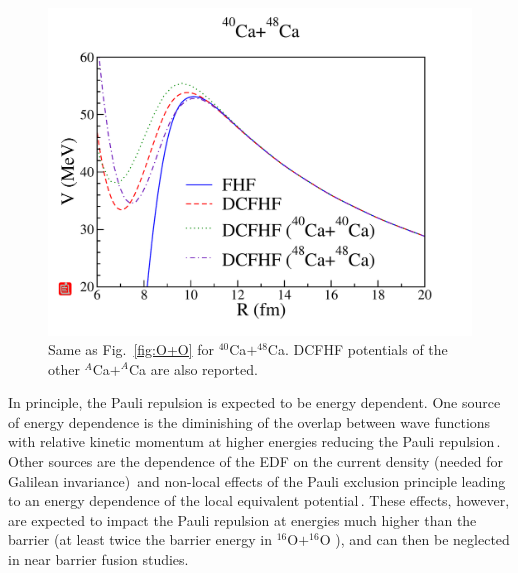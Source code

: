 \begin{figure}
	\includegraphics[width=\textwidth]{../Figures/Pauli/pot_40Ca+48Ca.pdf}
	\caption{Same as Fig.~\ref{fig:O+O} for $^{40}$Ca$+^{48}$Ca. DCFHF potentials of the other $^{A}$Ca$+^{A}$Ca are also reported.}
	\label{fig:Ca+Ca}
\end{figure}

In principle, the Pauli repulsion is expected to be energy dependent.
One source of energy dependence is the diminishing of the overlap between 
wave functions with relative kinetic momentum at higher energies
reducing the Pauli repulsion\,\citep{fliessbach1971,brink1975,goritz1976,beck1978}.
Other sources are the dependence of the EDF on the current density 
(needed for Galilean invariance)\,\citep{brink1975} and
non-local effects of the Pauli exclusion principle leading to an energy dependence 
of the local equivalent potential\,\citep{schmid1982,chamon2002}.
These effects, however, are expected to impact the Pauli repulsion at energies 
much higher than the barrier (at least twice the barrier energy in 
$^{16}$O$+^{16}$O \citep{fliessbach1971,brink1975}),
and can then be neglected in near barrier fusion studies.

